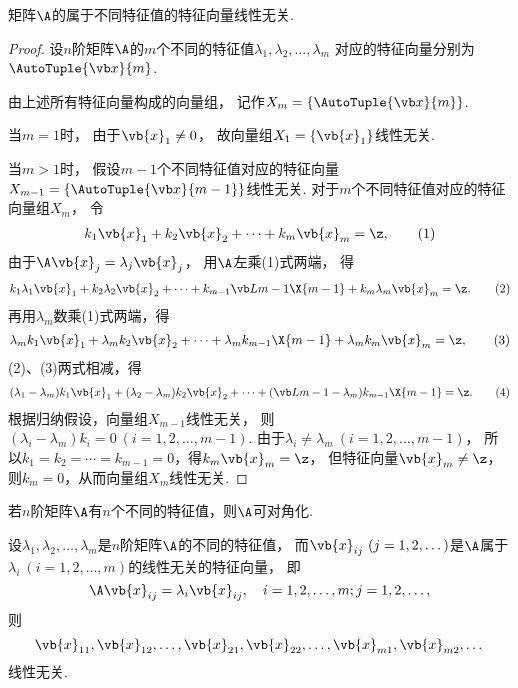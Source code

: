 \begin{theorem}
矩阵\(\A\)的属于不同特征值的特征向量线性无关.
\begin{proof}
设\(n\)阶矩阵\(\A\)的\(m\)个不同的特征值\(\lambda_1,\lambda_2,\dotsc,\lambda_m\)
对应的特征向量分别为\(\AutoTuple{\x}{m}\).

由上述所有特征向量构成的向量组，
记作\(X_m=\{\AutoTuple{\x}{m}\}\).

当\(m=1\)时，
由于\(\vb{x}_1 \neq 0\)，
故向量组\(X_1=\{\vb{x}_1\}\)线性无关.

当\(m>1\)时，
假设\(m-1\)个不同特征值对应的特征向量\(X_{m-1}=\{\AutoTuple{\x}{m-1}\}\)线性无关.
对于\(m\)个不同特征值对应的特征向量组\(X_m\)，
令\begin{gather}
	k_1\vb{x}_1+k_2\vb{x}_2+\dotsb+k_m\vb{x}_m=\z,
	\tag1
\end{gather}
由于\(\A\vb{x}_j=\lambda_j\vb{x}_j\)，
用\(\A\)左乘(1)式两端，
得\begin{gather}
	k_1\lambda_1\vb{x}_1+k_2\lambda_2\vb{x}_2
	+\dotsb+k_{m-1}\L{m-1}\X{m-1}+k_m\lambda_m\vb{x}_m=\z.
	\tag2
\end{gather}
再用\(\lambda_m\)数乘(1)式两端，得\begin{gather}
	\lambda_mk_1\vb{x}_1+\lambda_mk_2\vb{x}_2
	+\dotsb+\lambda_mk_{m-1}\X{m-1}+\lambda_mk_m\vb{x}_m=\z,
	\tag3
\end{gather}
(2)、(3)两式相减，得\begin{gather}
	(\lambda_1-\lambda_m)k_1\vb{x}_1+(\lambda_2-\lambda_m)k_2\vb{x}_2
	+\dotsb+(\L{m-1}-\lambda_m)k_{m-1}\X{m-1}=\z.
	\tag4
\end{gather}
根据归纳假设，向量组\(X_{m-1}\)线性无关，
则\((\lambda_i-\lambda_m)k_i=0\ (i=1,2,\dotsc,m-1)\).
由于\(\lambda_i\neq\lambda_m\ (i=1,2,\dotsc,m-1)\)，
所以\(k_1=k_2=\dotsb=k_{m-1}=0\)，得\(k_m\vb{x}_m=\z\)，
但特征向量\(\vb{x}_m\neq\z\)，则\(k_m=0\)，从而向量组\(X_m\)线性无关.
\end{proof}
\end{theorem}

\begin{corollary}[矩阵可对角化的充分条件]\label{theorem:矩阵可对角化的充分条件.定理1}
若\(n\)阶矩阵\(\A\)有\(n\)个不同的特征值，则\(\A\)可对角化.
\end{corollary}

\begin{theorem}
设\(\lambda_1,\lambda_2,\dotsc,\lambda_m\)是\(n\)阶矩阵\(\A\)的不同的特征值，
而\(\vb{x}_{ij}\ (j=1,2,\dotsc)\)是\(\A\)属于\(\lambda_i\ (i=1,2,\dotsc,m)\)的线性无关的特征向量，
即\[
	\A \vb{x}_{ij} = \lambda_i \vb{x}_{ij},
	\quad i=1,2,\dotsc,m;j=1,2,\dotsc,
\]
则\[
	\vb{x}_{11},\vb{x}_{12},\dotsc,\vb{x}_{21},\vb{x}_{22},\dotsc,\vb{x}_{m1},\vb{x}_{m2},\dotsc
\]线性无关.
\end{theorem}

